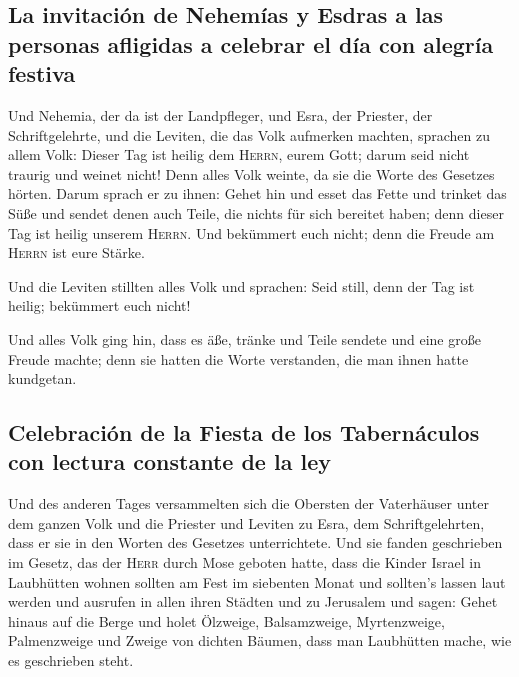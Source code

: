 \hypertarget{la-invitaciuxf3n-de-nehemuxedas-y-esdras-a-las-personas-afligidas-a-celebrar-el-duxeda-con-alegruxeda-festiva}{%
\subsection{La invitación de Nehemías y Esdras a las personas afligidas
a celebrar el día con alegría
festiva}\label{la-invitaciuxf3n-de-nehemuxedas-y-esdras-a-las-personas-afligidas-a-celebrar-el-duxeda-con-alegruxeda-festiva}}

 Und Nehemia, der da ist der Landpfleger, und Esra, der
Priester, der Schriftgelehrte, und die Leviten, die das Volk aufmerken
machten, sprachen zu allem Volk: Dieser Tag ist heilig dem
\textsc{Herrn}, eurem Gott; darum seid nicht traurig und weinet nicht!
Denn alles Volk weinte, da sie die Worte des Gesetzes hörten.
 Darum sprach er zu ihnen: Gehet hin und esset das Fette
und trinket das Süße und sendet denen auch Teile, die nichts für sich
bereitet haben; denn dieser Tag ist heilig unserem \textsc{Herrn}. Und
bekümmert euch nicht; denn die Freude am \textsc{Herrn} ist eure Stärke.

 Und die Leviten stillten alles Volk und sprachen: Seid
still, denn der Tag ist heilig; bekümmert euch nicht!

 Und alles Volk ging hin, dass es äße, tränke und Teile
sendete und eine große Freude machte; denn sie hatten die Worte
verstanden, die man ihnen hatte kundgetan.

\hypertarget{celebraciuxf3n-de-la-fiesta-de-los-tabernuxe1culos-con-lectura-constante-de-la-ley}{%
\subsection{Celebración de la Fiesta de los Tabernáculos con lectura
constante de la
ley}\label{celebraciuxf3n-de-la-fiesta-de-los-tabernuxe1culos-con-lectura-constante-de-la-ley}}

 Und des anderen Tages versammelten sich die Obersten der
Vaterhäuser unter dem ganzen Volk und die Priester und Leviten zu Esra,
dem Schriftgelehrten, dass er sie in den Worten des Gesetzes
unterrichtete.  Und sie fanden geschrieben im Gesetz, das
der \textsc{Herr} durch Mose geboten hatte, dass die Kinder Israel in
Laubhütten wohnen sollten am Fest im siebenten Monat  und
sollten's lassen laut werden und ausrufen in allen ihren Städten und zu
Jerusalem und sagen: Gehet hinaus auf die Berge und holet Ölzweige,
Balsamzweige, Myrtenzweige, Palmenzweige und Zweige von dichten Bäumen,
dass man Laubhütten mache, wie es geschrieben steht.

